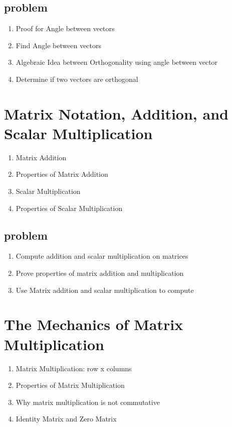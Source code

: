 \documentclass{article}
\begin{document}
\subsection{problem}
\begin{enumerate}
    \item Proof for Angle between vectors
    \item Find Angle between vectors
    \item Algebraic Idea between Orthogonality using angle between vector
    \item Determine if two vectors are orthogonal
\end{enumerate}

\section{Matrix Notation, Addition, and Scalar Multiplication}

\begin{enumerate}
    \item Matrix Addition
    \item Properties of Matrix Addition
    \item Scalar Multiplication
    \item Properties of Scalar Multiplication
\end{enumerate}

\subsection{problem}
\begin{enumerate}
    \item Compute addition and scalar multiplication on matrices
    \item Prove properties of matrix addition and multiplication
    \item Use Matrix addition and scalar multiplication to compute
\end{enumerate}

\section{The Mechanics of Matrix Multiplication}

\begin{enumerate}
    \item Matrix Multiplication: row x columns
    \item Properties of Matrix Multiplication
    \item Why matrix multiplication is not commutative
    \item Identity Matrix and Zero Matrix
\end{enumerate}
\end{document}
